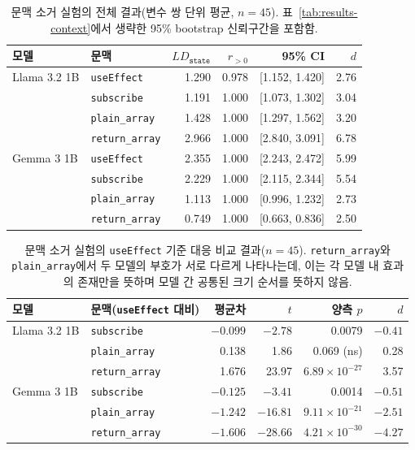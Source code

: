 \begin{table}[t]
  \centering
  \small
  \begin{supertabular}{llrrrr}
    \toprule
    \textbf{모델} & \textbf{문맥} & $LD_{\texttt{state}}$ & $r_{>0}$ & \textbf{95\% CI} & \textbf{$d$} \\
    \midrule
    Llama 3.2 1B & \texttt{useEffect} & 1.290 & 0.978 & [1.152, 1.420] & 2.76 \\
    & \texttt{subscribe} & 1.191 & 1.000 & [1.073, 1.302] & 3.04 \\
    & \texttt{plain\_array} & 1.428 & 1.000 & [1.297, 1.562] & 3.20 \\
    & \texttt{return\_array} & 2.966 & 1.000 & [2.840, 3.091] & 6.78 \\
    \midrule
    Gemma 3 1B & \texttt{useEffect} & 2.355 & 1.000 & [2.243, 2.472] & 5.99 \\
    & \texttt{subscribe} & 2.229 & 1.000 & [2.115, 2.344] & 5.54 \\
    & \texttt{plain\_array} & 1.113 & 1.000 & [0.996, 1.232] & 2.73 \\
    & \texttt{return\_array} & 0.749 & 1.000 & [0.663, 0.836] & 2.50 \\
    \bottomrule
  \end{supertabular}
  \caption{문맥 소거 실험의 전체 결과(변수 쌍 단위 평균, $n=45$). 표~\ref{tab:results-context}에서 생략한 95\% bootstrap 신뢰구간을 포함함.}
  \label{tab:app-ablationB-full}
\end{table}

\begin{table}[t]
  \centering
  \small
  \begin{supertabular}{llrrrr}
    \toprule
    \textbf{모델} & \textbf{문맥(\texttt{useEffect} 대비)} & \textbf{평균차} & \textbf{$t$} & \textbf{양측 $p$} & \textbf{$d$} \\
    \midrule
    Llama 3.2 1B & \texttt{subscribe} & $-0.099$ & $-2.78$ & 0.0079 & $-0.41$ \\
    & \texttt{plain\_array} & 0.138 & 1.86 & 0.069 (ns) & 0.28 \\
    & \texttt{return\_array} & 1.676 & 23.97 & $6.89\times10^{-27}$ & 3.57 \\
    \midrule
    Gemma 3 1B & \texttt{subscribe} & $-0.125$ & $-3.41$ & 0.0014 & $-0.51$ \\
    & \texttt{plain\_array} & $-1.242$ & $-16.81$ & $9.11\times10^{-21}$ & $-2.51$ \\
    & \texttt{return\_array} & $-1.606$ & $-28.66$ & $4.21\times10^{-30}$ & $-4.27$ \\
    \bottomrule
  \end{supertabular}
  \caption{문맥 소거 실험의 \texttt{useEffect} 기준 대응 비교 결과($n=45$). \texttt{return\_array}와 \texttt{plain\_array}에서 두 모델의 부호가 서로 다르게 나타나는데, 이는 각 모델 내 효과의 존재만을 뜻하며 모델 간 공통된 크기 순서를 뜻하지 않음.}
  \label{tab:app-ablationB-paired}
\end{table}
